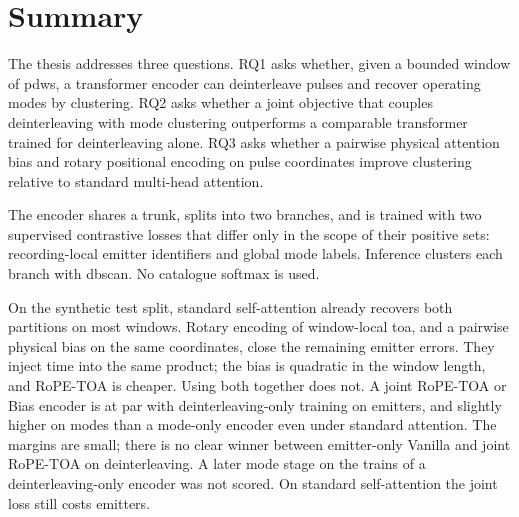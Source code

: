 \section{Summary}\label{sec:concl:summary}

The thesis addresses three questions.
RQ1 asks whether, given a bounded window of \glspl{pdw}, a transformer encoder can deinterleave pulses and recover operating modes by clustering.
RQ2 asks whether a joint objective that couples deinterleaving with mode clustering outperforms a comparable transformer trained for deinterleaving alone.
RQ3 asks whether a pairwise physical attention bias and rotary positional encoding on pulse coordinates improve clustering relative to standard multi-head attention.

The encoder shares a trunk, splits into two branches, and is trained with two supervised contrastive losses that differ only in the scope of their positive sets: recording-local emitter identifiers and global mode labels.
Inference clusters each branch with \gls{dbscan}. No catalogue softmax is used.

On the synthetic test split, standard self-attention already recovers both partitions on most windows.
Rotary encoding of window-local \gls{toa}, and a pairwise physical bias on the same coordinates, close the remaining emitter errors.
They inject time into the same product; the bias is quadratic in the window length, and RoPE-TOA is cheaper.
Using both together does not.
A joint RoPE-TOA or Bias encoder is at par with deinterleaving-only training on emitters, and slightly higher on modes than a mode-only encoder even under standard attention.
The margins are small; there is no clear winner between emitter-only Vanilla and joint RoPE-TOA on deinterleaving.
A later mode stage on the trains of a deinterleaving-only encoder was not scored.
On standard self-attention the joint loss still costs emitters.
